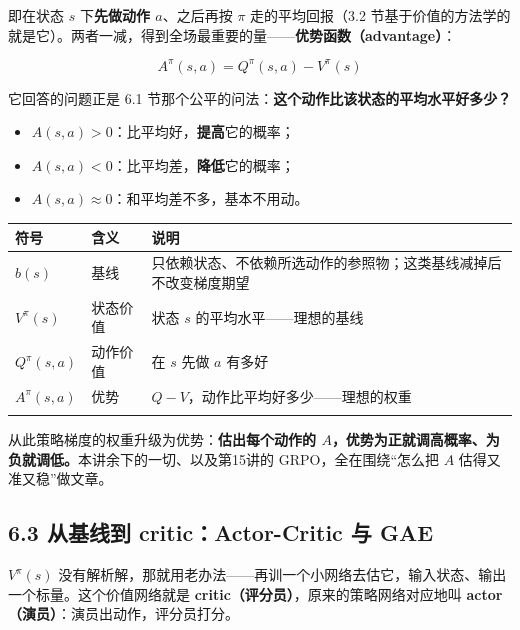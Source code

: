 \documentclass[
  chinese,
]{ctexart}
\providecommand{\tightlist}{%
  \setlength{\itemsep}{0pt}\setlength{\parskip}{0pt}}
\begin{document}
即在状态 \(s\) 下\textbf{先做动作 \(a\)}、之后再按 \(\pi\)
走的平均回报（3.2
节基于价值的方法学的就是它）。两者一减，得到全场最重要的量------\textbf{优势函数（advantage）}：

\[
A^\pi(s,a)=Q^\pi(s,a)-V^\pi(s)
\]

它回答的问题正是 6.1
节那个公平的问法：\textbf{这个动作比该状态的平均水平好多少？}

\begin{itemize}
\tightlist
\item
  \(A(s,a)>0\)：比平均好，\textbf{提高}它的概率；
\item
  \(A(s,a)<0\)：比平均差，\textbf{降低}它的概率；
\item
  \(A(s,a)\approx 0\)：和平均差不多，基本不用动。
\end{itemize}

\begin{center}
\begin{tabular}{@{}>{\raggedright\arraybackslash}p{} >{\raggedright\arraybackslash}p{} >{\raggedright\arraybackslash}p{}@{}}
\toprule\noalign{}
符号 & 含义 & 说明 \\
\midrule\noalign{}
\(b(s)\) & 基线 & 只依赖状态、不依赖所选动作的参照物；这类基线减掉后不改变梯度期望 \\
\(V^\pi(s)\) & 状态价值 & 状态 \(s\) 的平均水平------理想的基线 \\
\(Q^\pi(s,a)\) & 动作价值 & 在 \(s\) 先做 \(a\) 有多好 \\
\(A^\pi(s,a)\) & 优势 & \(Q-V\)，动作比平均好多少------理想的权重 \\
\bottomrule\noalign{}
\end{tabular}
\end{center}

从此策略梯度的权重升级为优势：\textbf{估出每个动作的
\(A\)，优势为正就调高概率、为负就调低。}本讲余下的一切、以及第15讲的
GRPO，全在围绕``怎么把 \(A\) 估得又准又稳''做文章。

\subsection{6.3 从基线到 critic：Actor-Critic 与
GAE}\label{ux4eceux57faux7ebfux5230-criticactor-critic-ux4e0e-gae}

\(V^\pi(s)\)
没有解析解，那就用老办法------再训一个小网络去估它，输入状态、输出一个标量。这个价值网络就是
\textbf{critic（评分员）}，原来的策略网络对应地叫
\textbf{actor（演员）}：演员出动作，评分员打分。
\end{document}
